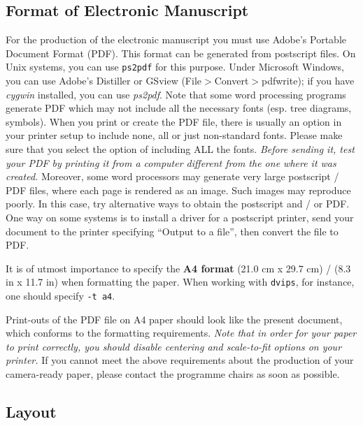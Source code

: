 \documentclass[11pt]{article}
\begin{document}
\subsection{Format of Electronic Manuscript}
\label{sect:pdf}

For the production of the electronic manuscript you must use Adobe's
Portable Document Format (PDF). This format can be generated from
postscript files. On Unix systems, you can use {\tt ps2pdf} for
this purpose. Under Microsoft Windows, you can use Adobe's Distiller
or GSview (File$>$Convert$>$pdfwrite); if you have \textit{cygwin}
installed, you can use \textit{ps2pdf}. Note that
some word processing programs generate PDF which may not include all
the necessary fonts (esp. tree diagrams, symbols). When you print or
create the PDF file, there is usually an option in your printer setup
to include none, all or just non-standard fonts.  Please make sure
that you select the option of including ALL the fonts. {\em Before
sending it, test your PDF by printing it from a computer different
from the one where it was created.} Moreover, some word processors may
generate very large postscript / PDF files, where each page is rendered
as an image. Such images may reproduce poorly. In this case, try
alternative ways to obtain the postscript and / or PDF. One way on some
systems is to install a driver for a postscript printer, send your
document to the printer specifying ``Output to a file'', then convert
the file to PDF.


It is of utmost importance to specify the \textbf{A4 format} (21.0 cm
x 29.7 cm) / (8.3 in x 11.7 in) when formatting the paper. When working with
{\tt dvips}, for instance, one should specify {\tt -t a4}.

Print-outs of the PDF file on A4 paper should look like the present document,
which conforms to the formatting requirements. {\em Note that in order for
your paper to print correctly, you should disable centering and scale-to-fit
options on your printer.} If you cannot meet the above requirements about the
production of your camera-ready paper, please contact the programme chairs
as soon as possible.


\subsection{Layout}
\label{ssec:layout}
\end{document}

